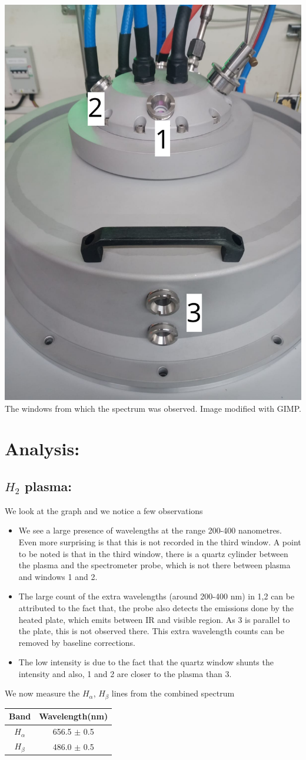 \documentclass[]{report}[12 pt]
\begin{document}
\begin{center}
		\includegraphics[width=5 cm]{plasma3.png}\\
		The windows from which the spectrum was observed. Image modified with GIMP.
	\end{center}
\section*{Analysis:}
\subsection*{$H_2$ plasma:}
We look at the graph and we notice a few observations
\begin{itemize}
	\item We see a large presence of wavelengths at the range 200-400 nanometres. Even more surprising is that this is not recorded in the third window. A point to be noted is that in the third window, there is a quartz cylinder between the plasma and the spectrometer probe, which is not there between plasma and windows 1 and 2. 
	\item The large count of the extra wavelengths (around 200-400 nm) in 1,2 can be attributed to the fact that, the probe also detects the emissions done by the heated plate, which emits between IR and visible region. As 3 is parallel to the plate, this is not observed there. This extra wavelength counts can be removed by baseline corrections.
	\item The low intensity is due to the fact that the quartz window shunts the intensity  and also, 1  and 2 are closer to the plasma than 3.
\end{itemize}
We now measure the $H_\alpha$, $H_\beta$ lines from the combined spectrum
\begin{center}
\begin{tabular}{|c|c|}
	\hline
	Band & Wavelength(nm) \\
	\hline
	$H_\alpha$ & 656.5 $\pm$ 0.5  \\
	\hline
	$H_\beta$& 486.0 $\pm$ 0.5 \\
	\hline
\end{tabular}
\end{center}
\end{document}
